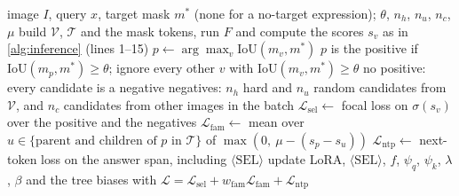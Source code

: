 \begin{algorithm*}[t]
\caption{One training step of \ours{} for one query}
\label{alg:training}
\begin{algorithmic}[1]
\Require image $I$, query $x$, target mask $m^\ast$ (none for a no-target expression); $\theta$, $n_h$, $n_u$, $n_c$, $\mu$
\State build $\mathcal{V}$, $\mathcal{T}$ and the mask tokens, run $F$ and compute the scores $s_v$ as in \cref{alg:inference} (lines 1--15)
  \State $p \gets \arg\max_v \mathrm{IoU}(m_v, m^\ast)$
  \State $p$ is the positive if $\mathrm{IoU}(m_p, m^\ast) \geq \theta$; ignore every other $v$ with $\mathrm{IoU}(m_v, m^\ast) \geq \theta$
\Else
  \State no positive: every candidate is a negative
\EndIf
\State negatives: $n_h$ hard and $n_u$ random candidates from $\mathcal{V}$, and $n_c$ candidates from other images in the batch
\State $\mathcal{L}_{\mathrm{sel}} \gets$ focal loss on $\sigma(s_v)$ over the positive and the negatives
\State $\mathcal{L}_{\mathrm{fam}} \gets$ mean over $u \in \{\text{parent and children of } p \text{ in } \mathcal{T}\}$ of $\max(0,\ \mu - (s_p - s_u))$
\State $\mathcal{L}_{\mathrm{ntp}} \gets$ next-token loss on the answer span, including $\langle\mathrm{SEL}\rangle$
\State update LoRA, $\langle\mathrm{SEL}\rangle$, $f$, $\psi_q$, $\psi_k$, $\lambda$, $\beta$ and the tree biases with
$\mathcal{L} = \mathcal{L}_{\mathrm{sel}} + w_{\mathrm{fam}}\mathcal{L}_{\mathrm{fam}} + \mathcal{L}_{\mathrm{ntp}}$
\end{algorithmic}
\end{algorithm*}
